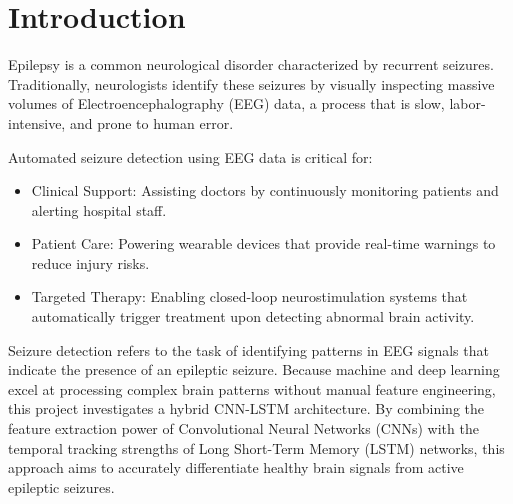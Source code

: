 \section{Introduction}
Epilepsy is a common neurological disorder characterized by recurrent seizures. Traditionally, neurologists identify these seizures by visually inspecting massive volumes of Electroencephalography (EEG) data, a process that is slow, labor-intensive, and prone to human error.

Automated seizure detection using EEG data is critical for:
\begin{itemize}
    \item Clinical Support: Assisting doctors by continuously monitoring patients and alerting hospital staff.
    \item Patient Care: Powering wearable devices that provide real-time warnings to reduce injury risks.
    \item Targeted Therapy: Enabling closed-loop neurostimulation systems that automatically trigger treatment upon detecting abnormal brain activity.
\end{itemize}

Seizure detection refers to the task of identifying patterns in EEG signals that indicate the presence of an epileptic seizure.
Because machine and deep learning excel at processing complex brain patterns without manual feature engineering, this project investigates a hybrid CNN-LSTM architecture. By combining the feature extraction power of Convolutional Neural Networks (CNNs) with the temporal tracking strengths of Long Short-Term Memory (LSTM) networks, this approach aims to accurately differentiate healthy brain signals from active epileptic seizures.


